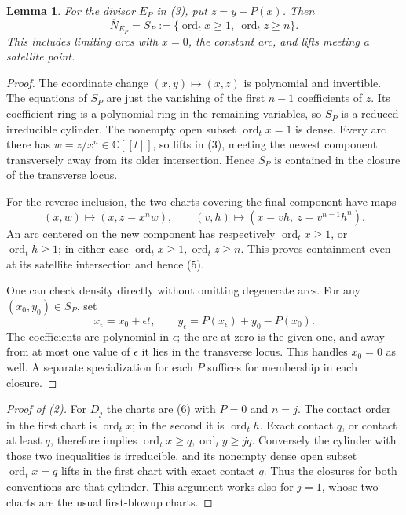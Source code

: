 \documentclass[11pt]{article}
\newtheorem{lemma}[theorem]{Lemma}
\newcommand{\C}{\mathbb C}
\newcommand{\ord}{\operatorname{ord}_t}
\newcommand{\Nash}{\overline N}
\begin{document}
\begin{lemma}\label{lem:cylinder}
For the divisor \(E_P\) in (3), put \(z=y-P(x)\). Then
\[
 \Nash_{E_P}=S_P:=\{\ord x\geq1,\ \ord z\geq n\}.           \tag{5}
\]
This includes limiting arcs with \(x=0\), the constant arc, and
lifts meeting a satellite point.
\end{lemma}

\begin{proof}
The coordinate change \((x,y)\mapsto(x,z)\) is polynomial and invertible.
The equations of \(S_P\) are just the vanishing of the first \(n-1\)
coefficients of \(z\). Its coefficient ring is a polynomial ring in the
remaining variables, so \(S_P\) is a reduced irreducible cylinder.
The nonempty open subset \(\ord x=1\) is dense. Every arc there has
\(w=z/x^n\in\C[[t]]\), so lifts in (3), meeting the newest component
transversely away from its older intersection. Hence \(S_P\) is contained
in the closure of the transverse locus.

For the reverse inclusion, the two charts covering the final component
have maps
\[
 (x,w)\longmapsto(x,z=x^n w),\qquad
 (v,h)\longmapsto(x=vh,\ z=v^{n-1}h^n).                    \tag{6}
\]
An arc centered on the new component has respectively \(\ord x\geq1\),
or \(\ord h\geq1\); in either case \(\ord x\geq1,\ord z\geq n\).
This proves containment even at its satellite intersection and hence (5).

One can check density directly without omitting degenerate arcs.
For any \((x_0,y_0)\in S_P\), set
\[
 x_\epsilon=x_0+\epsilon t,\qquad
 y_\epsilon=P(x_\epsilon)+y_0-P(x_0).
\]
The coefficients are polynomial in \(\epsilon\); the arc at zero is the
given one, and away from at most one value of \(\epsilon\) it lies in the
transverse locus. This handles \(x_0=0\) as well. A separate specialization
for each \(P\) suffices for membership in each closure.
\end{proof}

\begin{proof}[Proof of (2)]
For \(D_j\) the charts are (6) with \(P=0\) and \(n=j\).
The contact order in the first chart is \(\ord x\); in the second it is
\(\ord h\). Exact contact \(q\), or contact at least \(q\), therefore
implies \(\ord x\geq q,\ord y\geq jq\).
Conversely the cylinder with those two inequalities is irreducible, and
its nonempty dense open subset \(\ord x=q\) lifts in the first chart
with exact contact \(q\). Thus the closures for both conventions are
that cylinder. This argument works also for \(j=1\), whose two charts
are the usual first-blowup charts.
\end{proof}
\end{document}
